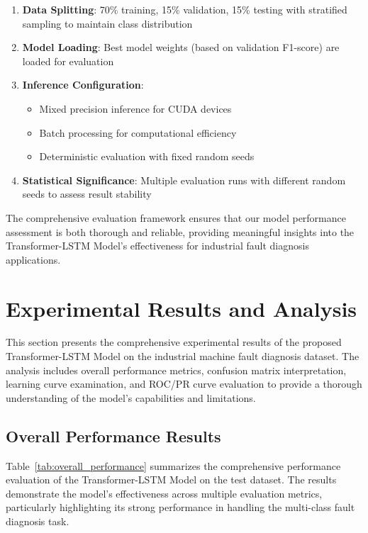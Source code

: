 \begin{enumerate}
    \item \textbf{Data Splitting}: 70\% training, 15\% validation, 15\% testing with stratified sampling to maintain class distribution
    
    \item \textbf{Model Loading}: Best model weights (based on validation F1-score) are loaded for evaluation
    
    \item \textbf{Inference Configuration}: 
    \begin{itemize}
        \item Mixed precision inference for CUDA devices
        \item Batch processing for computational efficiency
        \item Deterministic evaluation with fixed random seeds
    \end{itemize}
    
    \item \textbf{Statistical Significance}: Multiple evaluation runs with different random seeds to assess result stability
\end{enumerate}

The comprehensive evaluation framework ensures that our model performance assessment is both thorough and reliable, providing meaningful insights into the Transformer-LSTM Model's effectiveness for industrial fault diagnosis applications.

\section{Experimental Results and Analysis}
\label{sec:experiments:results_analysis}

This section presents the comprehensive experimental results of the proposed Transformer-LSTM Model on the industrial machine fault diagnosis dataset. The analysis includes overall performance metrics, confusion matrix interpretation, learning curve examination, and ROC/PR curve evaluation to provide a thorough understanding of the model's capabilities and limitations.

\subsection{Overall Performance Results}
\label{subsec:overall_performance}

Table~\ref{tab:overall_performance} summarizes the comprehensive performance evaluation of the Transformer-LSTM Model on the test dataset. The results demonstrate the model's effectiveness across multiple evaluation metrics, particularly highlighting its strong performance in handling the multi-class fault diagnosis task.

